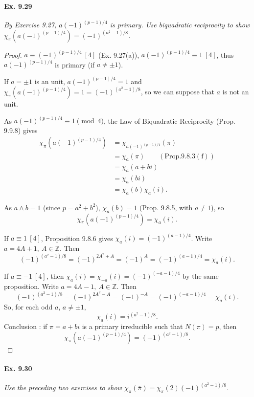 \documentclass[11pt,a4paper]{article}
\newcommand{\Z}{\mathbb{Z}}
\begin{document}
\paragraph{Ex. 9.29} 

{\it By Exercise 9.27, $a(-1)^{(p-1)/4}$ is primary. Use biquadratic reciprocity to show $\chi_\pi(a(-1)^{(p-1)/4}) = (-1)^{(a^2-1)/8}$.
}

\begin{proof}
$a \equiv (-1)^{(p-1)/4}\ [4]$ (Ex. 9.27(a)), $a  (-1)^{(p-1)/4} \equiv 1\  [4]$, thus $a  (-1)^{(p-1)/4}$ is primary (if $a \neq \pm 1$).

If $a = \pm 1$ is an unit, $a  (-1)^{(p-1)/4} = 1$ and $\chi_\pi(a(-1)^{(p-1)/4}) = 1 = (-1)^{(a^2-1)/8}$, so we can suppose that $a$ is not an unit.

As $a  (-1)^{(p-1)/4} \equiv 1 \pmod 4$, the Law of Biquadratic Reciprocity (Prop. 9.9.8) gives
\begin{align*}
\chi_\pi(a(-1)^{(p-1)/4}) &= \chi_{a(-1)^{(p-1)/4}}(\pi) \\
&= \chi_a(\pi) \qquad (\mathrm{Prop. 9.8.3(f)})\\
&=\chi_a(a+bi)\\
&=\chi_a(bi)\\
&=\chi_a(b) \chi_a(i).
\end{align*}

As $a \wedge b=1$ (since $p = a^2+b^2$), $\chi_a(b) = 1$ (Prop. 9.8.5, with $a\neq 1$), so
$$\chi_\pi(a(-1)^{(p-1)/4}) =  \chi_a(i).$$
 
 If $a\equiv 1 \ [4]$, Proposition 9.8.6 gives $\chi_a(i) = (-1)^{(a-1)/4}$. Write $a = 4A + 1,\ A\in \Z$. Then 
 $$(-1)^{(a^2-1)/8} = (-1)^{2A^2+A} = (-1)^A = (-1)^{(a-1)/4} = \chi_a(i).$$
 
 If $a \equiv -1 \ [4]$, then $\chi_a(i) = \chi_{-a}(i) = (-1)^{(-a-1)/4}$ by the same proposition. Write $a = 4A-1,\ A \in \Z$. Then
 $$(-1)^{(a^2-1)/8} = (-1)^{2A^2 - A} =(-1)^{-A} = (-1)^{(-a-1)/4} = \chi_a(i).$$
 So, for each odd $a$, $a \ne \pm 1$, $$\chi_a(i) = i^{(a^2-1)/8}.$$
 Conclusion : if $\pi = a + bi$ is a primary irreducible such that $N(\pi) = p$, then
  $$\chi_\pi(a (-1)^{(p-1)/4}) =  (-1)^{(a^2-1)/8}.$$
\end{proof}

\paragraph{Ex. 9.30}

{\it Use the preceding two exercises to show $\chi_\pi(\overline{\pi}) = \chi_\pi(2) (-1)^{(a^2-1)/8}$.
}
\end{document}
